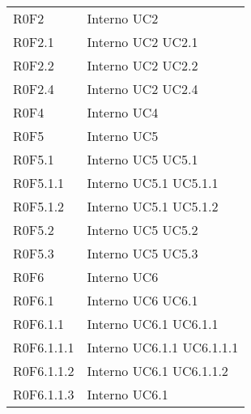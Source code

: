 \begin{longtable}{p{2.5cm}!{\VRule[1pt]}p{2.5cm}}
R0F2 & Interno \newline UC2
 \\
R0F2.1 & Interno \newline UC2
 \newline UC2.1
 \\
R0F2.2 & Interno \newline UC2
 \newline UC2.2
 \\
R0F2.4 & Interno \newline UC2
 \newline UC2.4
 \\
R0F4 & Interno \newline UC4
 \\
R0F5 & Interno \newline UC5
 \\
R0F5.1 & Interno \newline UC5
 \newline UC5.1
 \\
R0F5.1.1 & Interno \newline UC5.1
 \newline UC5.1.1
 \\
R0F5.1.2 & Interno \newline UC5.1
 \newline UC5.1.2
 \\
R0F5.2 & Interno \newline UC5
 \newline UC5.2
 \\
R0F5.3 & Interno \newline UC5
 \newline UC5.3
 \\
R0F6 & Interno \newline UC6
 \\
R0F6.1 & Interno \newline UC6
 \newline UC6.1
 \\
R0F6.1.1 & Interno \newline UC6.1
 \newline UC6.1.1
 \\
R0F6.1.1.1 & Interno \newline UC6.1.1
 \newline UC6.1.1.1
 \\
R0F6.1.1.2 & Interno \newline UC6.1
 \newline UC6.1.1.2
 \\
R0F6.1.1.3 & Interno \newline UC6.1

\end{longtable}
